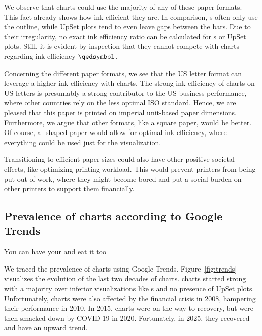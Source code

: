 \documentclass[11pt,letterpaper]{article}
\def\pie{}%
\newcommand{\pie}{{\fontspec{Symbola}\char"1F967}}
\begin{document}
We observe that \pie{}charts could use the majority of any of these paper formats. This fact already shows how ink efficient they are. In comparison, \venn{}s often only use the outline, while UpSet plots tend to even leave gaps between the bars. Due to their irregularity, no exact ink efficiency ratio can be calculated for \venn{}s or UpSet plots. Still, it is evident by inspection that they cannot compete with \pie{}charts regarding ink efficiency $\qedsymbol$.

Concerning the different paper formats, we see that the US letter format can leverage a higher ink efficiency with \pie{}charts. The strong ink efficiency of \pie{}charts on US letters is presumably a strong contributor to the US business performance, where other countries rely on the less optimal ISO standard. Hence, we are pleased that this paper is printed on imperial unit-based paper dimensions. Furthermore, we argue that other formats, like a square paper, would be better. Of course, a \pie{}-shaped paper would allow for optimal ink efficiency, where everything could be used just for the \pie{} visualization. 

Transitioning to efficient paper sizes could also have other positive societal effects, like optimizing printing workload. This would prevent printers from being put out of work, where they might become bored and put a social burden on other printers to support them financially.









\subsection{Prevalence of \pie{}charts according to Google Trends}
\epigraph{You can have your \pie{} and eat it too}{}


We traced the prevalence of \pie{}charts using Google Trends. Figure~\ref{fig:trends} visualizes the evolution of the last two decades of \pie{}charts. \pie{}charts started strong with a majority over inferior visualizations like \venn{}s and no presence of UpSet plots. Unfortunately, \pie{}charts were also affected by the financial crisis in 2008, hampering their performance in 2010. In 2015, \pie{}charts were on the way to recovery, but were then smacked down by COVID-19 in 2020. Fortunately, in 2025, they recovered and have an upward trend.  
\end{document}
